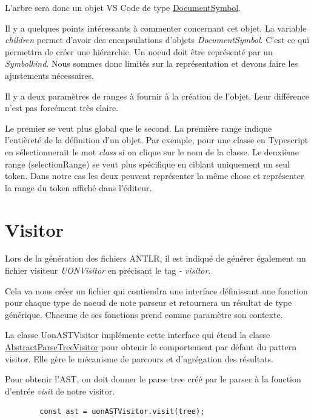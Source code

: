 \documentclass[
    iict, %
    il, %
]{heig-tb}
\begin{document}
L'arbre sera donc un objet VS Code de type \href{https://code.visualstudio.com/api/references/vscode-api#DocumentSymbol}{DocumentSymbol}.

Il y a quelques points intéressants à commenter concernant cet objet.
La variable \emph{children} permet d'avoir des encapsulations d'objets \emph{DocumentSymbol}. C'est ce qui permettra de créer une hiérarchie.
Un noeud doit être représenté par un \emph{Symbolkind}. Nous sommes donc limités sur la représentation et devons faire les ajustements nécessaires.

Il y a deux paramètres de ranges à fournir à la création de l'objet. Leur différence n'est pas forcément très claire.

Le premier se veut plus global que le second.
La première range indique l'entièreté de la définition d'un objet. Par exemple, pour une classe en Typescript en sélectionnerait le mot \emph{class} si on clique sur le nom de la classe.
Le deuxième range (selectionRange) se veut plus spécifique en ciblant uniquement un seul token.
Dans notre cas les deux peuvent représenter la même chose et représenter la range du token affiché dans l'éditeur.

\section{Visitor}

Lors de la génération des fichiers ANTLR, il est indiqué de générer également un fichier visiteur \emph{UONVisitor} en précisant le tag \emph{- visitor}.

Cela va nous créer un fichier qui contiendra une interface définissant une fonction pour chaque type de noeud de note parseur et retournera un résultat de type générique.
Chacune de ses fonctions prend comme paramètre son contexte.

La classe UonASTVisitor implémente cette interface qui étend la classe \href{https://www.antlr.org/api/Java/org/antlr/v4/runtime/tree/AbstractParseTreeVisitor.html}{AbstractParseTreeVisitor}
pour obtenir le comportement par défaut du pattern visitor. Elle gère le mécanisme de parcours et d’agrégation des résultats.

Pour obtenir l'AST, on doit donner le parse tree créé par le parser à la fonction d'entrée \emph{visit} de notre visitor.

\begin{listing}[!ht]
    \begin{verbatim}
        const ast = uonASTVisitor.visit(tree);
    \end{verbatim}
\end{listing}
\end{document}
